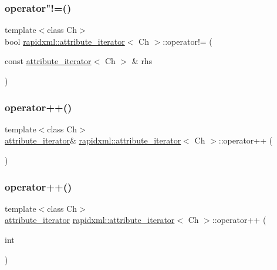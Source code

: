 \subsubsection{\texorpdfstring{operator"!=()}{operator!=()}}
{\footnotesize\ttfamily template$<$class Ch$>$ \\
bool \mbox{\hyperlink{classrapidxml_1_1attribute__iterator}{rapidxml\+::attribute\+\_\+iterator}}$<$ Ch $>$\+::operator!= (\begin{DoxyParamCaption}\item[{const \mbox{\hyperlink{classrapidxml_1_1attribute__iterator}{attribute\+\_\+iterator}}$<$ Ch $>$ \&}]{rhs }\end{DoxyParamCaption})\hspace{0.3cm}{\ttfamily [inline]}}

\mbox{\label{classrapidxml_1_1attribute__iterator_afe7d15a4a1b228f97f1d4ebd4f3f6cca}} 
\subsubsection{\texorpdfstring{operator++()}{operator++()}\hspace{0.1cm}{\footnotesize\ttfamily [1/2]}}
{\footnotesize\ttfamily template$<$class Ch$>$ \\
\mbox{\hyperlink{classrapidxml_1_1attribute__iterator}{attribute\+\_\+iterator}}\& \mbox{\hyperlink{classrapidxml_1_1attribute__iterator}{rapidxml\+::attribute\+\_\+iterator}}$<$ Ch $>$\+::operator++ (\begin{DoxyParamCaption}{ }\end{DoxyParamCaption})\hspace{0.3cm}{\ttfamily [inline]}}

\mbox{\label{classrapidxml_1_1attribute__iterator_a82c8859b9eebd45caa3afc25b9e78c36}} 
\subsubsection{\texorpdfstring{operator++()}{operator++()}\hspace{0.1cm}{\footnotesize\ttfamily [2/2]}}
{\footnotesize\ttfamily template$<$class Ch$>$ \\
\mbox{\hyperlink{classrapidxml_1_1attribute__iterator}{attribute\+\_\+iterator}} \mbox{\hyperlink{classrapidxml_1_1attribute__iterator}{rapidxml\+::attribute\+\_\+iterator}}$<$ Ch $>$\+::operator++ (\begin{DoxyParamCaption}\item[{int}]{ }\end{DoxyParamCaption})\hspace{0.3cm}{\ttfamily [inline]}}

